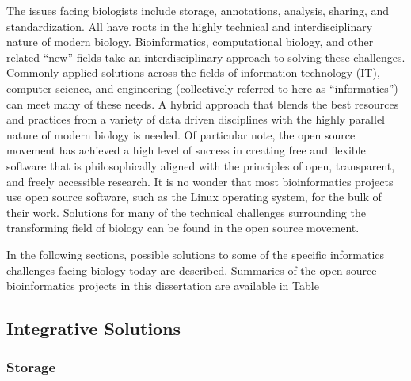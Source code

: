 The issues facing biologists include storage, annotations, analysis, sharing, and
standardization.  All have roots in the highly technical and interdisciplinary
nature of modern biology.  Bioinformatics, computational biology, and other
related ``new'' fields take an interdisciplinary approach to solving these
challenges.  Commonly applied solutions across the fields of information
technology (IT), computer science, and engineering (collectively referred to
here as ``informatics'') can meet many of these needs.  A hybrid
approach that blends the best resources and practices from a variety
of data driven disciplines with the highly parallel nature of modern biology is needed.
Of particular note, the open source movement has achieved a high level of
success in creating free and flexible software that is philosophically aligned
with the principles of open, transparent, and freely accessible research.  It
is no wonder that most bioinformatics projects use open source software, such
as the Linux operating system, for the bulk of their work.  Solutions for many
of the technical challenges surrounding the transforming field of biology can
be found in the open source movement.

In the following sections, possible solutions to some of the specific informatics
challenges facing biology today are described. Summaries of the open source
bioinformatics projects in this dissertation are available in Table %


\subsection{Integrative Solutions}

\subsubsection{Storage}

